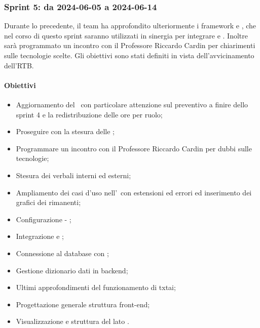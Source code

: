 \subsubsection{Sprint 5: da 2024-06-05 a 2024-06-14}
\par Durante lo  precedente, il team ha approfondito ulteriormente i framework  e , che nel corso di questo sprint saranno utilizzati in sinergia per integrare  e .
Inoltre sarà programmato un incontro con il Professore Riccardo Cardin per chiarimenti sulle tecnologie scelte. Gli obiettivi sono stati definiti in vista dell'avvicinamento dell'RTB. 


\paragraph{Obiettivi}
\begin{itemize}
  \item Aggiornamento del \PdP\ con particolare attenzione sul preventivo a finire dello sprint 4 e la redistribuzione delle ore per ruolo;
  \item Proseguire con la stesura delle \NdP;
  \item Programmare un incontro con il Professore Riccardo Cardin per dubbi sulle tecnologie;
  \item Stesura dei verbali interni ed esterni;
  \item Ampliamento dei casi d'uso nell'\AdR\ con estensioni ed errori ed inserimento dei grafici dei  rimanenti;
  \item Configurazione  - ;
  \item Integrazione  e ;
  \item Connessione al database con ;
  \item Gestione  dizionario dati in backend;
  \item Ultimi approfondimenti del funzionamento di txtai;
  \item Progettazione generale struttura front-end;
  \item Visualizzazione  e struttura del  lato .
\end{itemize}

